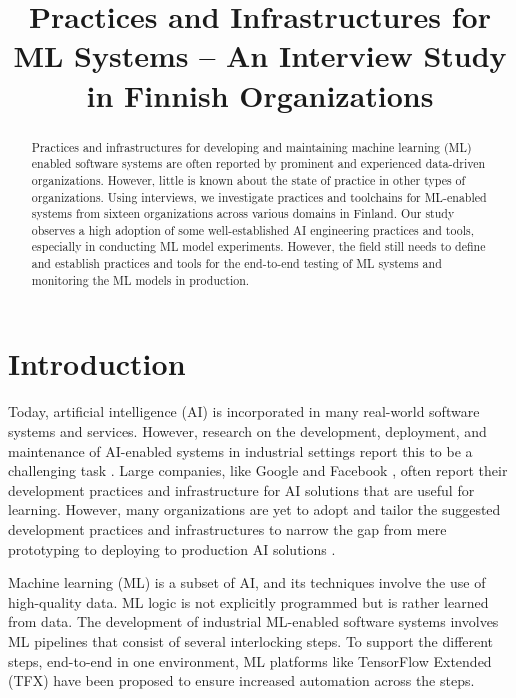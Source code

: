 \documentclass{IEEEcsmag}
\begin{document}
\title{Practices and Infrastructures for ML Systems -- An Interview Study in Finnish Organizations}

\author{
}

\begin{abstract}
Practices and infrastructures for developing and maintaining machine learning (ML) enabled software systems are often reported by prominent and experienced data-driven organizations. However, little is known about the state of practice in other types of organizations. Using interviews, we investigate practices and toolchains for ML-enabled systems from sixteen organizations across various domains in Finland. Our study observes a high adoption of some well-established AI engineering practices and tools, especially in conducting ML model experiments. However, the field still needs to define and establish practices and tools for the end-to-end testing of ML systems and monitoring the ML models in production.
\end{abstract}

\maketitle

\section{\textbf{Introduction}}
\label{sec: introduction}
Today, artificial intelligence (AI) is incorporated in many real-world software systems and services. However, research on the development, deployment, and maintenance of AI-enabled systems in industrial settings report this to be a challenging task \cite{Sculley2015, Lwakatare2019}. Large companies, like Google \cite{Baylor2017} and Facebook \cite{Hazelwood2018Facebook}, often report their development practices and infrastructure for AI solutions that are useful for learning. However, many organizations are yet to adopt and tailor the suggested development practices and infrastructures to narrow the gap from mere prototyping to deploying to production AI solutions \cite{Serban2020Practices}. 

Machine learning (ML) is a subset of AI, and its techniques involve the use of high-quality data. ML logic is not explicitly programmed but is rather learned from data. The development of industrial ML-enabled software systems involves ML pipelines that consist of several interlocking steps. To support the different steps, end-to-end in one environment, ML platforms like TensorFlow Extended (TFX) \cite{Baylor2017} have been proposed to ensure increased automation across the steps.
\end{document}
